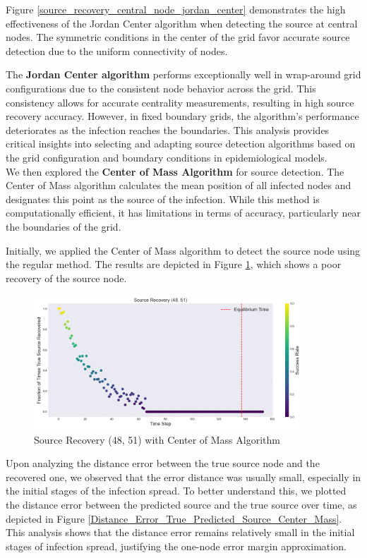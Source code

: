 Figure \ref{source_recovery_central_node_jordan_center} demonstrates the high effectiveness of the Jordan Center algorithm when detecting the source at central nodes. The symmetric conditions in the center of the grid favor accurate source detection due to the uniform connectivity of nodes.

The \textbf{Jordan Center algorithm} performs exceptionally well in wrap-around grid configurations due to the consistent node behavior across the grid. This consistency allows for accurate centrality measurements, resulting in high source recovery accuracy. However, in fixed boundary grids, the algorithm's performance deteriorates as the infection reaches the boundaries. This analysis provides critical insights into selecting and adapting source detection algorithms based on the grid configuration and boundary conditions in epidemiological models.\\

We then explored the \textbf{Center of Mass Algorithm} for source detection. The Center of Mass algorithm calculates the mean position of all infected nodes and designates this point as the source of the infection. While this method is computationally efficient, it has limitations in terms of accuracy, particularly near the boundaries of the grid.

Initially, we applied the Center of Mass algorithm to detect the source node using the regular method. The results are depicted in Figure \ref{source_recovery_48_51_Center_of_Mass}, which shows a poor recovery of the source node.

\begin{figure}[H]
\centering
\includegraphics[width=0.9\textwidth]{img/source_recovery_48_51_Center_of_Mass.png}
\caption{Source Recovery (48, 51) with Center of Mass Algorithm}
\label{source_recovery_48_51_Center_of_Mass}
\end{figure}

Upon analyzing the distance error between the true source node and the recovered one, we observed that the error distance was usually small, especially in the initial stages of the infection spread. To better understand this, we plotted the distance error between the predicted source and the true source over time, as depicted in Figure \ref{Distance_Error_True_Predicted_Source_Center_Mass}. This analysis shows that the distance error remains relatively small in the initial stages of infection spread, justifying the one-node error margin approximation.


